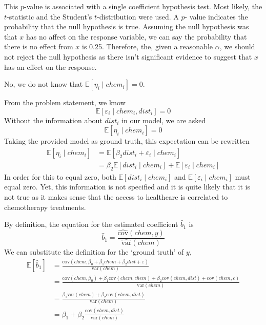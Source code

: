 \documentclass[12pt,twoside]{article}
\begin{document}
\begin{problems}
\problem  %

This $p$-value is associated with a single coefficient hypothesis test. Most
likely, the $t$-statistic and the Student's $t$-distribution were used. A $p$-
value indicates the probability that the null hypothesis is true. Assuming the
null hypothesis was that $x$ has no affect on the response variable, we can
say the probability that there is no effect from $x$ is 0.25. Therefore, the,
given a reasonable $\alpha$, we should not reject the null hypothesis as there
isn't significant evidence to suggest that $x$ has an effect on the response.

\newpage

\problem  %

\begin{problemparts}

\problempart %

No, we do not know that $\mathbb{E}[\eta_i \mid chem_i] = 0$. 

From the problem statement, we know
$$ \mathbb{E}[\varepsilon_i \mid chem_i, dist_i] = 0 $$
Without the information about $dist_i$ in our model, we are asked
$$ \mathbb{E}[\eta_i \mid chem_i] = 0 $$
Taking the provided model as ground truth, this expectation can be rewritten
\begin{align*}
    \mathbb{E}[\eta_i \mid chem_i] &= \mathbb{E}[\beta_2 dist_i + \varepsilon_i
    \mid chem_i] \\
    &= \boxed{\beta_2 \mathbb{E}[dist_i \mid chem_i] + \mathbb{E}[\varepsilon_i 
    \mid chem_i]}
\end{align*}
In order for this to equal zero, both $\mathbb{E}[dist_i \mid chem_i]$ and
$\mathbb{E}[\varepsilon_i \mid chem_i]$ must equal zero. Yet, this information
is not specified and it is quite likely that it is not true as it makes sense
that the access to healthcare is correlated to chemotherapy treatments.

\problempart %
By definition, the equation for the estimated coefficient $\hat{b}_1$ is
$$ \hat{b}_1 = \frac{\hat{\mathrm{cov}}(chem, y)}{\hat{\mathrm{var}}(chem)} $$
We can substitute the definition for the `ground truth' of $y$,
\begin{align*}
    \mathbb{E}[\hat{b}_1] &= \frac{\mathrm{cov}(chem, \beta_0 + \beta_1 chem + \beta_2 
    dist + \varepsilon)}{\mathrm{var}(chem)} \\
    &= \frac{\mathrm{cov}(chem, \beta_0) + \beta_1 \mathrm{cov}(chem, 
    chem) + \beta_2 \mathrm{cov}(chem, dist) + \mathrm{cov} (chem,
    \varepsilon)}{\mathrm{var}(chem)} \\
    &= \frac{\beta_1 \mathrm{var}(chem) + \beta_2\mathrm{cov}(chem, 
    dist)}{\mathrm{var}(chem)} \\
    &= \boxed{\beta_1 + \beta_2\frac{\mathrm{cov}(chem, dist)}{\mathrm{var}(chem)}}
\end{align*}


\end{problemparts}
\end{problems}
\end{document}
